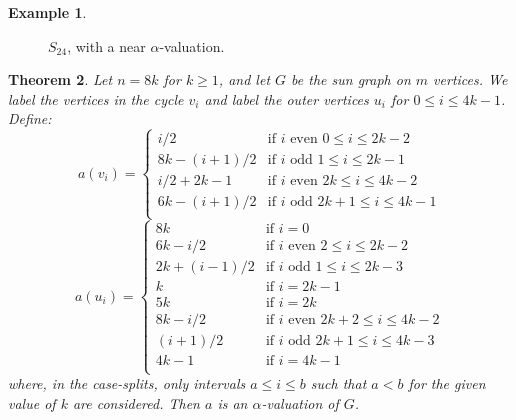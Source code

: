 \documentclass[12pt, a4paper]{article}
\newtheorem{theorem}{Theorem}[section]
\theoremstyle{definition}
\newtheorem{example}[theorem]{Example}
\begin{document}
\begin{example}
\begin{figure}
\begin{center}
    \end{center}
    \caption{$S_{24}$, with a near $\alpha$-valuation.}
\end{figure}
\end{example}


\begin{theorem}
    Let $n=8k$ for $k\geq 1$, and let $G$ be the sun graph on $m$ vertices. We label the vertices in the cycle $v_i$ and label the outer vertices $u_i$ for $0 \leq i \leq 4k-1$. Define:
    \[
    a(v_i)=
    \begin{cases}
        i/2 & \text{if } i \text{ even } 0 \leq i \leq 2k-2\\
        8k-(i+1)/2 & \text{if } i \text{ odd } 1 \leq i \leq 2k-1\\
        i/2 +2k-1 & \text{if } i \text{ even } 2k \leq i \leq 4k-2\\
        6k - (i+1)/2 & \text{if } i \text{ odd } 2k+1 \leq i \leq 4k-1\\
    \end{cases}
    \]
    \[
    a(u_i)=
    \begin{cases}
        8k & \text{if } i =0\\
        6k-i/2 & \text{if } i \text{ even } 2 \leq i \leq 2k-2\\
        2k+(i-1)/2 & \text{if } i \text{ odd } 1 \leq i \leq 2k-3\\
        k & \text{if } i =2k-1\\
        5k & \text{if } i =2k\\
        8k-i/2 & \text{if } i \text{ even } 2k+2 \leq i \leq 4k-2\\
        (i+1)/2 & \text{if } i \text{ odd } 2k+1 \leq i \leq 4k-3\\
        4k-1 & \text{if } i =4k-1\\
    \end{cases}
    \]
where, in the case-splits, only intervals $a \leq i \leq b$ such that $a < b$ for the given value of $k$ are considered.  Then $a$ is an $\alpha$-valuation of $G$.
\end{theorem}
\end{document}
